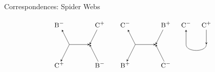 \documentclass{beamer}
\begin{document}
\begin{frame}{Correspondences: Spider Webs}
\begin{figure}[h!]
\[\begin{tikzpicture}
			\node (i32) at (3.75,-6) {$\textsc{\small B}^-$};
			\node (ii32) at (5.75,-6) {$\textsc{\small C}^+$};
			\node (d32) at (4.25,-7) {};
			\node (dd32) at (5.25,-7) {};
			\node (o32) at (3.75,-8) {$\textsc{\small C}^+$};
			\node (oo32) at (5.75,-8) {$\textsc{\small B}^-$};
			\draw[<-,>=stealth] (i32) -- (d32.center);
			\draw[->,>=stealth] (ii32) -- (dd32.center);
			\draw[->,>=stealth] (d32.center) -- (dd32.center);
			\draw[->,>=stealth, shorten >=5pt] (d32.center) -- (o32.center);
			\draw[<-,>=stealth, shorten >=5pt] (dd32.center) -- (oo32.center);
			
			\node (i33) at (7,-6) {$\textsc{\small C}^-$};
			\node (ii33) at (9,-6) {$\textsc{\small B}^+$};
			\node (d33) at (7.5,-7) {};
			\node (dd33) at (8.5,-7) {};
			\node (o33) at (7,-8) {$\textsc{\small B}^+$};
			\node (oo33) at (9,-8) {$\textsc{\small C}^-$};
			\draw[<-,>=stealth] (i33) -- (d33.center);
			\draw[->,>=stealth] (ii33) -- (dd33.center);
			\draw[->,>=stealth] (d33.center) -- (dd33.center);
			\draw[->,>=stealth, shorten >=5pt] (d33.center) -- (o33.center);
			\draw[<-,>=stealth, shorten >=5pt] (dd33.center) -- (oo33.center);
			
			\node (i34) at (10,-6) {$\textsc{\small C}^-$};
			\node (ii34) at (11,-6) {$\textsc{\small C}^+$};
			\node (d34) at (10,-7) {};
			\node (dd34) at (11,-7) {};
			\draw[<-,>=stealth] (i34) -- (d34.center);
			\draw[->,>=stealth] (ii34) -- (dd34.center);
			\draw (d34.center) edge [-,>=stealth,bend right=90] (dd34.center);
			
			\end{tikzpicture}
			\]
			\end{figure}
	\end{frame}
  	
\end{document}
